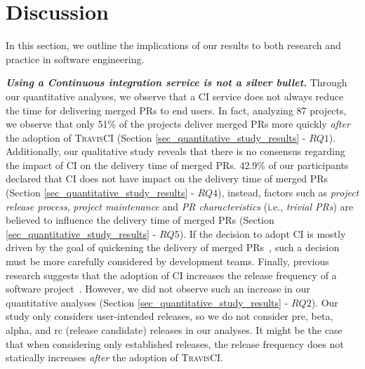 \section{Discussion}\label{sec_discussion}

In this section, we outline the implications of our results
to both research and practice in software engineering. 

{\em\bfseries Using a Continuous integration service is not a silver bullet.} Through our
quantitative analyses, we observe that a CI service does not always
reduce the time for delivering merged PRs 
to end users. In fact, analyzing 87 projects, we observe that
only 51\% of the projects deliver merged PRs more quickly \textit{after} the adoption of \textsc{TravisCI} (Section \ref{sec_quantitative_study_results} - $RQ1$). 
Additionally, our qualitative study reveals that there is no consensus regarding the impact of CI on the delivery time of merged PRs.
42.9\% of our participants declared that CI does not have impact on the delivery time of merged PRs (Section \ref{sec_quantitative_study_results} - $RQ4$), instead, factors such as \textit{project release process}, \textit{project maintenance} and \textit{PR characteristics} (i.e., \textit{trivial PRs}) are believed to influence the delivery time of merged PRs (Section \ref{sec_quantitative_study_results} - $RQ5$). 
If the decision to adopt CI is mostly driven by the goal of quickening the
delivery of merged PRs~\citep{Laukkanen2015-ab}, such a decision must be more
carefully considered by development teams. Finally, previous research suggests
that the adoption of CI increases the release frequency of a software
project~\cite{Hilton2016-xy}. However, we did not observe such an increase in
our quantitative analyses (Section \ref{sec_quantitative_study_results} - $RQ2$). Our study only considers user-intended releases, so we do not consider pre, beta, alpha, and rc (release candidate) releases in our analyses. It might be the case that when considering only established releases, the release frequency does not statically increases \textit{after} the adoption of \textsc{TravisCI}.

